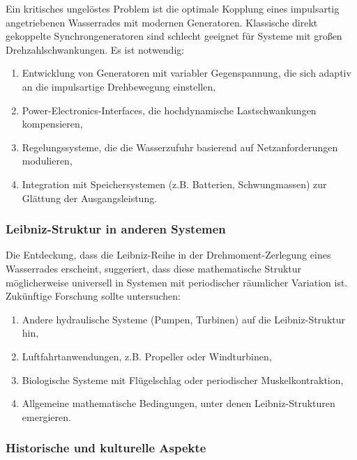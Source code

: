 \documentclass[a4paper,12pt]{article}
\theoremstyle{definition}
\begin{document}
Ein kritisches ungelöstes Problem ist die optimale Kopplung eines impulsartig angetriebenen Wasserrades mit modernen Generatoren. Klassische direkt gekoppelte Synchrongeneratoren sind schlecht geeignet für Systeme mit großen Drehzahlschwankungen. Es ist notwendig:
\begin{enumerate}
  \item Entwicklung von Generatoren mit variabler Gegenspannung, die sich adaptiv an die impulsartige Drehbewegung einstellen,
  \item Power-Electronics-Interfaces, die hochdynamische Lastschwankungen kompensieren,
  \item Regelungssysteme, die die Wasserzufuhr basierend auf Netzanforderungen modulieren,
  \item Integration mit Speichersystemen (z.B. Batterien, Schwungmassen) zur Glättung der Ausgangsleistung.
\end{enumerate}

\subsubsection*{Leibniz-Struktur in anderen Systemen}

Die Entdeckung, dass die Leibniz-Reihe in der Drehmoment-Zerlegung eines Wasserrades erscheint, suggeriert, dass diese mathematische Struktur möglicherweise universell in Systemen mit periodischer räumlicher Variation ist. Zukünftige Forschung sollte untersuchen:
\begin{enumerate}
  \item Andere hydraulische Systeme (Pumpen, Turbinen) auf die Leibniz-Struktur hin,
  \item Luftfahrtanwendungen, z.B. Propeller oder Windturbinen,
  \item Biologische Systeme mit Flügelschlag oder periodischer Muskelkontraktion,
  \item Allgemeine mathematische Bedingungen, unter denen Leibniz-Strukturen emergieren.
\end{enumerate}

\subsubsection*{Historische und kulturelle Aspekte}
\end{document}

